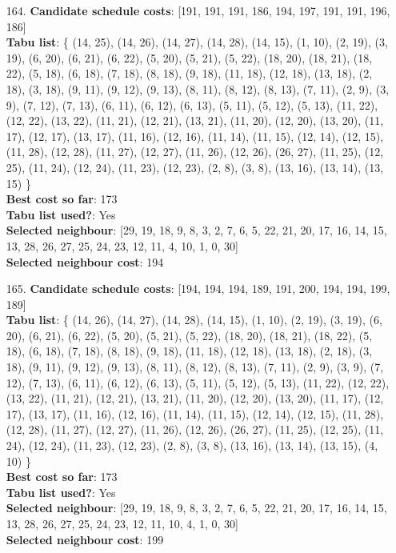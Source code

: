 \documentclass[fleqn]{article}
\begin{document}
\begin{itemize}
    \item[164.] \textbf{Candidate schedule costs}: [191, 191, 191, 186, 194, 197, 191, 191, 196, 186] \\
    \textbf{Tabu list}: \{ (14, 25), (14, 26), (14, 27), (14, 28), (14, 15), (1, 10), (2, 19), (3, 19), (6, 20), (6, 21), (6, 22), (5, 20), (5, 21), (5, 22), (18, 20), (18, 21), (18, 22), (5, 18), (6, 18), (7, 18), (8, 18), (9, 18), (11, 18), (12, 18), (13, 18), (2, 18), (3, 18), (9, 11), (9, 12), (9, 13), (8, 11), (8, 12), (8, 13), (7, 11), (2, 9), (3, 9), (7, 12), (7, 13), (6, 11), (6, 12), (6, 13), (5, 11), (5, 12), (5, 13), (11, 22), (12, 22), (13, 22), (11, 21), (12, 21), (13, 21), (11, 20), (12, 20), (13, 20), (11, 17), (12, 17), (13, 17), (11, 16), (12, 16), (11, 14), (11, 15), (12, 14), (12, 15), (11, 28), (12, 28), (11, 27), (12, 27), (11, 26), (12, 26), (26, 27), (11, 25), (12, 25), (11, 24), (12, 24), (11, 23), (12, 23), (2, 8), (3, 8), (13, 16), (13, 14), (13, 15) \} \\
    \textbf{Best cost so far}: 173 \\
    \textbf{Tabu list used?}: Yes \\
    \textbf{Selected neighbour}: [29, 19, 18, 9, 8, 3, 2, 7, 6, 5, 22, 21, 20, 17, 16, 14, 15, 13, 28, 26, 27, 25, 24, 23, 12, 11, 4, 10, 1, 0, 30] \\
    \textbf{Selected neighbour cost}: 194
      

    \item[165.] \textbf{Candidate schedule costs}: [194, 194, 194, 189, 191, 200, 194, 194, 199, 189] \\
    \textbf{Tabu list}: \{ (14, 26), (14, 27), (14, 28), (14, 15), (1, 10), (2, 19), (3, 19), (6, 20), (6, 21), (6, 22), (5, 20), (5, 21), (5, 22), (18, 20), (18, 21), (18, 22), (5, 18), (6, 18), (7, 18), (8, 18), (9, 18), (11, 18), (12, 18), (13, 18), (2, 18), (3, 18), (9, 11), (9, 12), (9, 13), (8, 11), (8, 12), (8, 13), (7, 11), (2, 9), (3, 9), (7, 12), (7, 13), (6, 11), (6, 12), (6, 13), (5, 11), (5, 12), (5, 13), (11, 22), (12, 22), (13, 22), (11, 21), (12, 21), (13, 21), (11, 20), (12, 20), (13, 20), (11, 17), (12, 17), (13, 17), (11, 16), (12, 16), (11, 14), (11, 15), (12, 14), (12, 15), (11, 28), (12, 28), (11, 27), (12, 27), (11, 26), (12, 26), (26, 27), (11, 25), (12, 25), (11, 24), (12, 24), (11, 23), (12, 23), (2, 8), (3, 8), (13, 16), (13, 14), (13, 15), (4, 10) \} \\
    \textbf{Best cost so far}: 173 \\
    \textbf{Tabu list used?}: Yes \\
    \textbf{Selected neighbour}: [29, 19, 18, 9, 8, 3, 2, 7, 6, 5, 22, 21, 20, 17, 16, 14, 15, 13, 28, 26, 27, 25, 24, 23, 12, 11, 10, 4, 1, 0, 30] \\
    \textbf{Selected neighbour cost}: 199
      


\end{itemize}
\end{document}
